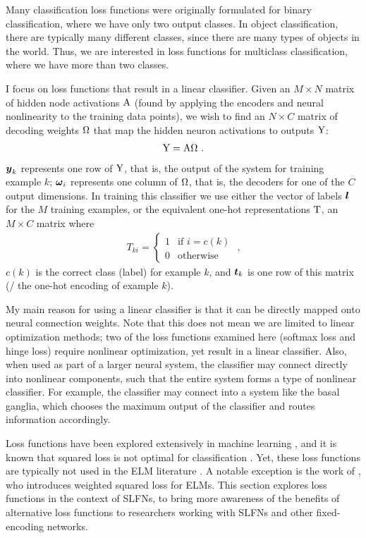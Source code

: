 Many classification loss functions were originally formulated
for binary classification, where we have only two output classes.
In object classification, there are typically many different classes,
since there are many types of objects in the world.
Thus, we are interested in loss functions
for multiclass classification,
where we have more than two classes.

I focus on loss functions that result in a linear classifier.
Given an $M \times N$ matrix of hidden node activations $\mathrm{A}$
(found by applying the encoders and neural nonlinearity to the training data points),
we wish to find an $N \times C$ matrix of decoding weights $\Omega$
that map the hidden neuron activations to outputs $\mathrm{Y}$:
\begin{align}
  \mathrm{Y} = \mathrm{A} \Omega \text{ .}
\end{align}
$\boldsymbol{y}_k$ represents one row of $\mathrm{Y}$,
that is, the output of the system for training example $k$;
$\boldsymbol{\omega}_i$ represents one column of $\Omega$,
that is, the decoders for one of the $C$ output dimensions.
In training this classifier we use either the vector of labels $\boldsymbol{l}$
for the $M$ training examples,
or the equivalent one-hot representations $\mathrm{T}$,
an $M \times C$ matrix where
\begin{align}
  T_{ki} = \begin{cases}
    1 & \text{if } i = c(k) \\
    0 & \text{otherwise}
  \end{cases} \text{ ,}
\end{align}
$c(k)$ is the correct class (label) for example $k$,
and $\boldsymbol{t}_k$ is one row of this matrix (\ie/ the one-hot encoding of example $k$).

My main reason for using a linear classifier
is that it can be directly mapped onto neural connection weights.
Note that this does not mean we are limited to linear optimization methods;
two of the loss functions examined here (softmax loss and hinge loss)
require nonlinear optimization,
yet result in a linear classifier.
Also, when used as part of a larger neural system,
the classifier may connect directly into nonlinear components,
such that the entire system forms a type of nonlinear classifier.
For example, the classifier may connect into a system like
the basal ganglia,
which chooses the maximum output of the classifier
and routes information accordingly.

Loss functions have been explored extensively
in machine learning \parencite[\eg/][]{Rosasco2004},
and it is known that squared loss
is not optimal for classification \parencite[][p. 186]{Bishop2006}.
Yet, these loss functions are typically not used in the ELM literature
\parencite[\eg/][]{McDonnell2015}.
A notable exception is the work of \textcite{Toh2008},
who introduces weighted squared loss for ELMs.
This section explores loss functions in the context of SLFNs,
to bring more awareness of the benefits of alternative loss functions
to researchers working with SLFNs and other fixed-encoding networks.



